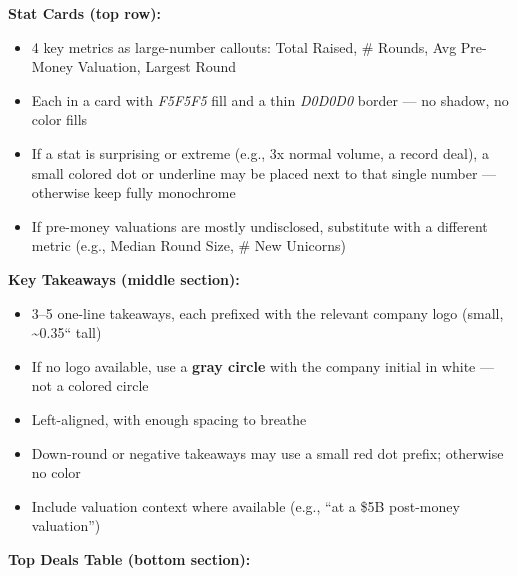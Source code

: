 \documentclass[11pt]{article}
\begin{document}
\textbf{Stat Cards (top row):}

\begin{itemize}[leftmargin=*,itemsep=2pt,topsep=2pt]
\item {} 4 key metrics as large-number callouts: Total Raised, \# Rounds, Avg Pre-Money Valuation, Largest Round
\item {} Each in a card with \emph{F5F5F5} fill and a thin \emph{D0D0D0} border — no shadow, no color fills
\item {} If a stat is surprising or extreme (e.g., 3x normal volume, a record deal), a small colored dot or underline may be placed next to that single number — otherwise keep fully monochrome
\item {} If pre-money valuations are mostly undisclosed, substitute with a different metric (e.g., Median Round Size, \# New Unicorns)
\end{itemize}

\textbf{Key Takeaways (middle section):}

\begin{itemize}[leftmargin=*,itemsep=2pt,topsep=2pt]
\item {} 3–5 one-line takeaways, each prefixed with the relevant company logo (small, \textasciitilde{}0.35`` tall)
\item {} If no logo available, use a \textbf{gray circle} with the company initial in white — not a colored circle
\item {} Left-aligned, with enough spacing to breathe
\item {} Down-round or negative takeaways may use a small red dot prefix; otherwise no color
\item {} Include valuation context where available (e.g., ``at a \$5B post-money valuation'')
\end{itemize}

\textbf{Top Deals Table (bottom section):}
\end{document}

